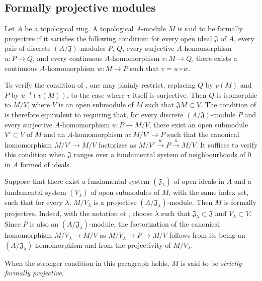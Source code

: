 \subsection{Formally projective modules}
\label{subsection:0.19.2}

\begin{definition}[19.2.1]
\label{0.19.2.1}
Let $A$ be a topological ring.
A topological $A$-module $M$ is said to be formally projective if it satisfies the following condition:
for every open ideal $\mathfrak J$ of $A$, every pair of discrete $(A/\mathfrak J)$-modules $P$, $Q$, every surjective $A$-homomorphism $u:P\to Q$, and every continuous $A$-homomorphism $v:M\to Q$, there exists a continuous $A$-homomorphism $w:M\to P$ such that $v=u\circ w$.
\end{definition}

\begin{env}[19.2.2]
\label{0.19.2.2}
To verify the condition of , one may plainly restrict, replacing $Q$ by $v(M)$ and $P$ by $u^{-1}(v(M))$, to the case where $v$ itself is surjective.
Then $Q$ is isomorphic to $M/V$, where $V$ is an open submodule of $M$ such that $\mathfrak JM\subset V$.
The condition of  is therefore equivalent to requiring that, for every discrete $(A/\mathfrak J)$-module $P$ and every surjective $A$-homomorphism $u:P\to M/V$, there exist an open submodule $V'\subset V$ of $M$ and an $A$-homomorphism $w:M/V'\to P$ such that the canonical homomorphism $M/V'\to M/V$ factorizes as $M/V'\xrightarrow{w}P\xrightarrow{u}M/V$.
It suffices to verify this condition when $\mathfrak J$ ranges over a fundamental system of neighbourhoods of $0$ in $A$ formed of ideals.
\end{env}

\begin{env}[19.2.3]
\label{0.19.2.3}
Suppose that there exist a fundamental system $(\mathfrak J_\lambda)$ of open ideals in $A$ and a fundamental system $(V_\lambda)$ of open submodules of $M$, with the same index set, such that for every $\lambda$, $M/V_\lambda$ is a projective $(A/\mathfrak J_\lambda)$-module.
Then $M$ is formally projective.
Indeed, with the notation of , choose $\lambda$ such that $\mathfrak J_\lambda\subset\mathfrak J$ and $V_\lambda\subset V$.
Since $P$ is also an $(A/\mathfrak J_\lambda)$-module, the factorization of the canonical homomorphism $M/V_\lambda\to M/V$ as $M/V_\lambda\to P\to M/V$ follows from its being an $(A/\mathfrak J_\lambda)$-homomorphism and from the projectivity of $M/V_\lambda$.

When the stronger condition in this paragraph holds, $M$ is said to be \emph{strictly formally projective}.
\end{env}

